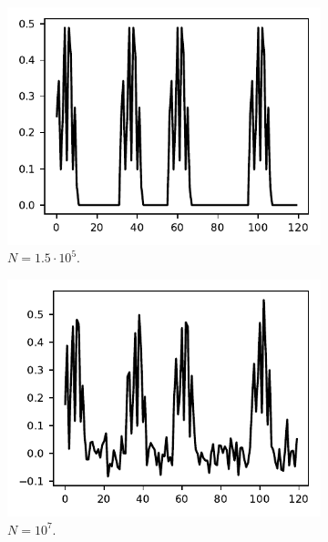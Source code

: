 \documentclass{article}
\begin{document}
\begin{figure}[!tb]
	\begin{subfigure}[ht]{0.245\textwidth}
		\centering
		\includegraphics[width=\columnwidth]{figures/y_clean.pdf}
		\caption{$N = 1.5 \cdot 10^5$.}
	\end{subfigure}
	\hfill
	\begin{subfigure}[ht]{0.245\textwidth}
		\centering
		\includegraphics[width=\columnwidth]{figures/y_SNR50.pdf}
		\caption{$N = 10^7$.}
	\end{subfigure}
	\hfill
	\begin{subfigure}[ht]{0.245\textwidth}
		\centering

\end{subfigure}
\end{figure}
\end{document}
